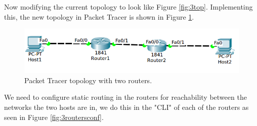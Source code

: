\documentclass{article}
\begin{document}
Now modifying the current topology to look like Figure \ref{fig:3top}. Implementing this, the new topology in Packet Tracer is shown in Figure \ref{fig:3pttop}. 

\begin{figure}[h]
    \centering
    \includegraphics[width=\textwidth]{3pttop}
    \caption{Packet Tracer topology with two routers.}
    \label{fig:3pttop}
\end{figure}

We need to configure static routing in the routers for reachability between the networks the two hosts are in, we do this in the "CLI" of each of the routers as seen in Figure \ref{fig:3routersconf}.
\end{document}

